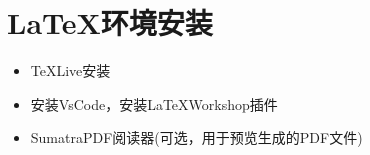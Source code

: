 \section{\LaTeX 环境安装}

\begin{itemize}
    \item \TeX Live安装
    \item 安装VsCode，安装\LaTeX Workshop插件
    \item SumatraPDF阅读器(可选，用于预览生成的PDF文件)
\end{itemize}

